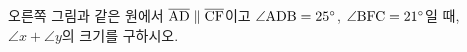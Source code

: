 \noindent\begin{minipage}[t]{0.58\linewidth}\vspace{0pt}\raggedright 오른쪽 그림과 같은 원에서 $\overline{\mathrm{AD}}\parallel\overline{\mathrm{CF}}$이고 $\angle\mathrm{ADB}=25^\circ$, $\angle\mathrm{BFC}=21^\circ$일 때, $\angle x+\angle y$의 크기를 구하시오.\end{minipage}\hfill\begin{minipage}[t]{0.4\linewidth}\vspace{0pt}\centering \resizebox{\ifdim\width>\linewidth\linewidth\else\width\fi}{!}{}\end{minipage}\par
